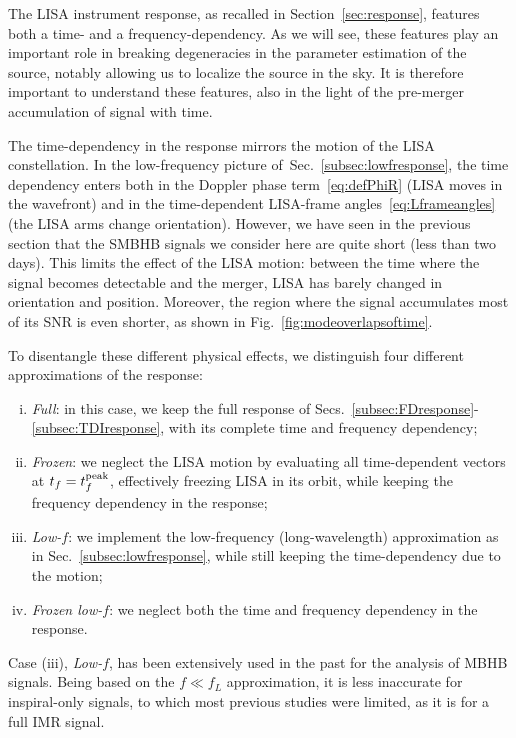 \documentclass[aps,showpacs,twocolumn,prd,superscriptaddress,nofootinbib]{revtex4-1}
\newcommand{\tf}{t_{f}}
\begin{document}
The LISA instrument response, as recalled in Section~\ref{sec:response}, features both a time- and a frequency-dependency. As we will see, these features play an important role in breaking degeneracies in the parameter estimation of the source, notably allowing us to localize the source in the sky. It is therefore important to understand these features, also in the light of the pre-merger accumulation of signal with time.

The time-dependency in the response mirrors the motion of the LISA constellation. In the low-frequency picture of~Sec.~\ref{subsec:lowfresponse}, the time dependency enters both in the Doppler phase term~\eqref{eq:defPhiR} (LISA moves in the wavefront) and in the time-dependent LISA-frame angles~\eqref{eq:Lframeangles} (the LISA arms change orientation). However, we have seen in the previous section that the SMBHB signals we consider here are quite short (less than two days). This limits the effect of the LISA motion: between the time where the signal becomes detectable and the merger, LISA has barely changed in orientation and position. Moreover, the region where the signal accumulates most of its SNR is even shorter, as shown in Fig.~\ref{fig:modeoverlapsoftime}.

To disentangle these different physical effects, we distinguish four different approximations of the response:
\begin{enumerate}[(i)]
	\item \textit{Full}: in this case, we keep the full response of Secs.~\ref{subsec:FDresponse}-\ref{subsec:TDIresponse}, with its complete time and frequency dependency;
	\item \textit{Frozen}: we neglect the LISA motion by evaluating all time-dependent vectors at $\tf = t_{f}^{\rm peak}$, effectively freezing LISA in its orbit, while keeping the frequency dependency in the response;
	\item \textit{Low-$f$}: we implement the low-frequency (long-wavelength) approximation as in Sec.~\ref{subsec:lowfresponse}, while still keeping the time-dependency due to the motion;
	\item \textit{Frozen low-$f$}: we neglect both the time and frequency dependency in the response.
\end{enumerate}

Case (iii), \textit{Low-$f$}, has been extensively used in the past for the analysis of MBHB signals. Being based on the $f \ll f_{L}$ approximation, it is less inaccurate for inspiral-only signals, to which most previous studies were limited, as it is for a full IMR signal.
\end{document}

